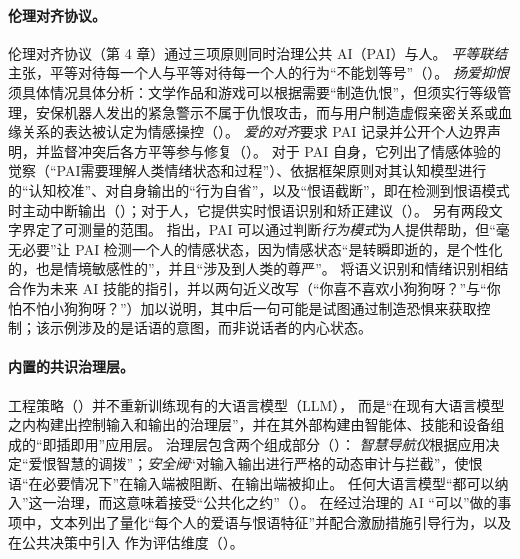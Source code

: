 \paragraph{伦理对齐协议。}
伦理对齐协议（第 4 章）通过三项原则同时治理公共 AI（PAI）与人。
\emph{平等联结}主张，平等对待每一个人与平等对待每一个人的行为“不能划等号”（）。
\emph{扬爱抑恨}须具体情况具体分析：文学作品和游戏可以根据需要“制造仇恨”，但须实行等级管理，安保机器人发出的紧急警示不属于仇恨攻击，而与用户制造虚假亲密关系或血缘关系的表达被认定为情感操控（）。
\emph{爱的对齐}要求 PAI 记录并公开个人边界声明，并监督冲突后各方平等参与修复（）。
对于 PAI 自身，它列出了情感体验的觉察（“PAI需要理解人类情绪状态和过程”）、依据框架原则对其认知模型进行的“认知校准”、对自身输出的“行为自省”，以及“恨语截断”，即在检测到恨语模式时主动中断输出（）；对于人，它提供实时恨语识别和矫正建议（）。
另有两段文字界定了可测量的范围。
 指出，PAI 可以通过判断\emph{行为模式}为人提供帮助，但“毫无必要”让 PAI 检测一个人的情感状态，因为情感状态“是转瞬即逝的，是个性化的，也是情境敏感性的”，并且“涉及到人类的尊严”。
 将语义识别和情绪识别相结合作为未来 AI 技能的指引，并以两句近义改写（“你喜不喜欢小狗狗呀？”与“你怕不怕小狗狗呀？”）加以说明，其中后一句可能是试图通过制造恐惧来获取控制；该示例涉及的是话语的意图，而非说话者的内心状态。

\paragraph{内置的共识治理层。}
工程策略（）并不重新训练现有的大语言模型（LLM），
而是“在现有大语言模型之内构建出控制输入和输出的治理层”，并在其外部构建由智能体、技能和设备组成的“即插即用”应用层。
治理层包含两个组成部分（）：
\emph{智慧导航仪}根据应用决定“爱恨智慧的调拨”；\emph{安全阀}“对输入输出进行严格的动态审计与拦截”，使恨语“在必要情况下”在输入端被阻断、在输出端被抑止。
任何大语言模型“都可以纳入”这一治理，而这意味着接受“公共化之约”（）。
在经过治理的 AI “可以”做的事项中，文本列出了量化“每个人的爱语与恨语特征”并配合激励措施引导行为，以及在公共决策中引入 \pol{} 作为评估维度（）。

